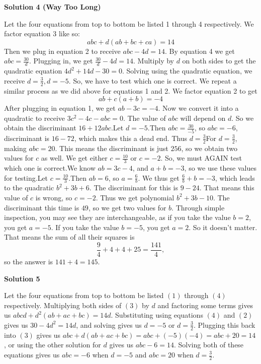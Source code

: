 \begin{enumerate}
\textbf{Solution 4 (Way Too Long)}

Let the four equations from top to bottom be listed 1 through 4 respectively. We factor equation 3 like so: 
 \[abc+d(ab+bc+ca)=14\]Then we plug in equation 2 to receive $abc-4d=14$. By equation 4 we get $abc=\frac{30}{d}$. Plugging in, we get $\frac{30}{d}-4d=14$. Multiply by $d$ on both sides to get the quadratic equation $4d^2+14d-30=0$. Solving using the quadratic equation, we receive $d=\frac{3}{2},d=-5$. So, we have to test which one is correct. We repeat a similar process as we did above for equations 1 and 2. We factor equation 2 to get 
 \[ab+c(a+b)=-4\]After plugging in equation 1, we get $ab-3c=-4$. Now we convert it into a quadratic to receive $3c^2-4c-abc=0$. The value of $abc$ will depend on $d$. So we obtain the discriminant $16+12abc$.Let $d = -5$.Then $abc = \frac{30}{-5}$, so $abc=-6$, discriminant is $16-72$, which makes this a dead end. Thus $d=\frac{3}{2}$For $d=\frac{3}{2}$, making $abc=20$. This means the discriminant is just $256$, so we obtain two values for $c$ as well. We get either $c=\frac{10}{3}$ or $c=-2$. So, we must AGAIN test which one is correct.We know $ab=3c-4$, and $a+b=-3$, so we use these values for testing.Let $c=\frac{10}{3}$.Then $ab=6$, so $a=\frac{6}{b}$. We thus get $\frac{6}{b}+b=-3$, which leads to the quadratic $b^2+3b+6$. The discriminant for this is $9-24$. That means this value of $c$ is wrong, so $c=-2$. Thus we get polynomial $b^2+3b-10$. The discriminant this time is $49$, so we get two values for $b$. Through simple inspection, you may see they are interchangeable, as if you take the value $b=2$, you get $a=-5$. If you take the value $b=-5$, you get $a=2$. So it doesn't matter. That means the sum of all their squares is
 \[\frac{9}{4}+4+4+25=\frac{141}{4},\]so the answer is $141+4=\boxed{145}.$




\textbf{Solution 5}

Let the four equations from top to bottom be listed $(1)$ through $(4)$ respectively. Multiplying both sides of $(3)$ by $d$ and factoring some terms gives us $abcd + d^2(ab + ac + bc) = 14d$. Substituting using equations $(4)$ and $(2)$ gives us $30 -4 d^2 = 14d$, and solving gives us $d = -5$ or $d = \frac{3}{2}$. Plugging this back into $(3)$ gives us $abc + d(ab + ac + bc) = abc + (-5)(-4) = abc + 20 = 14$, or using the other solution for $d$ gives us $abc - 6 = 14$. Solving both of these equations gives us $abc = -6$ when $d = -5$ and $abc = 20$ when $d = \frac{3}{2}$. 


\end{enumerate}
